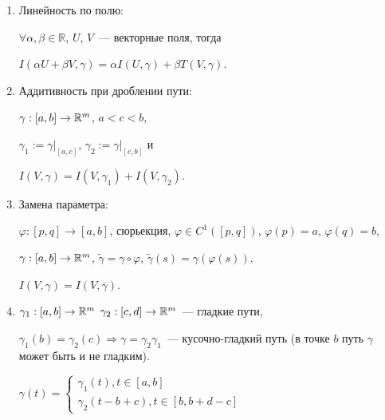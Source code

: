 \documentclass{article}
\begin{document}
        \begin{enumerate}
        
            \item Линейность по полю:
            
                $\forall \alpha, \beta \in \mathbb{R}$, $U$, $V$~--- векторные поля, тогда
                
                $I \left( \alpha U + \beta V, \gamma \right) = \alpha I \left(U, \gamma \right) + \beta T \left( V, \gamma \right)$.
                
            \item Аддитивность при дроблении пути:
            
                $\gamma : [a, b] \rightarrow \mathbb{R}^m$, $a < c < b$,
                
                $\gamma_1 := \gamma \big|_{[a, c]}$, $\gamma_2 := \gamma \big|_{[c, b]}$ и
                
                $I \left( V, \gamma \right) = I \left( V, \gamma_1 \right) + I \left( V, \gamma_2 \right)$.
                
            \item Замена параметра:
            
                $\varphi : [p, q] \rightarrow [a, b]$, сюрьекция, $\varphi \in C^1 \left( [p, q] \right)$, $\varphi(p) = a$, $\varphi(q) = b$,
                
                $\gamma : [a, b] \rightarrow \mathbb{R}^m$, $\widetilde{\gamma} = \gamma \circ \varphi$, $\widetilde{\gamma}(s) = \gamma (\varphi(s))$.
                
                $I \left( V, \gamma \right) = I \left( V, \overline{\gamma} \right)$.
                
            \item $\gamma_1 : [a, b] \rightarrow \mathbb{R}^m$ $\gamma_2 : [c, d] \rightarrow \mathbb{R}^m$~--- гладкие пути,
            
                $\gamma_1(b) = \gamma_2(c) \Rightarrow \gamma = \gamma_2 \gamma_1$~--- кусочно-гладкий путь (в точке $b$ путь $\gamma$ может быть и не гладким).
                
                $\gamma(t) = \begin{cases}
                    \gamma_1(t), t \in [a, b] \\
                    \gamma_2(t - b + c), t \in [b, b + d - c]
                \end{cases}$
                

\end{enumerate}
\end{document}
